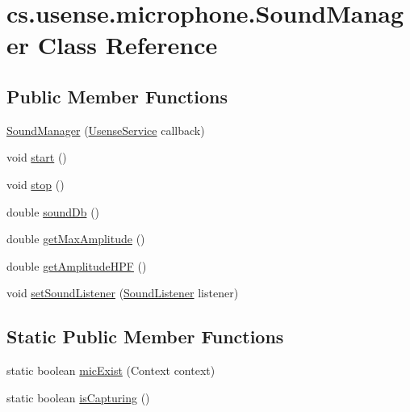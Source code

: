 \hypertarget{classcs_1_1usense_1_1microphone_1_1_sound_manager}{}\section{cs.\+usense.\+microphone.\+Sound\+Manager Class Reference}
\label{classcs_1_1usense_1_1microphone_1_1_sound_manager}
\subsection*{Public Member Functions}
\begin{DoxyCompactItemize}
\item 
\hyperlink{classcs_1_1usense_1_1microphone_1_1_sound_manager_a19056164df8fe6de6f14e92e55de2b8a}{Sound\+Manager} (\hyperlink{classcs_1_1usense_1_1_usense_service}{Usense\+Service} callback)
\item 
void \hyperlink{classcs_1_1usense_1_1microphone_1_1_sound_manager_ae7631d35a3f90932b3c568f2cc6ddc6b}{start} ()
\item 
void \hyperlink{classcs_1_1usense_1_1microphone_1_1_sound_manager_af050c3c4176f1b7bbc2d955ba0e7fd60}{stop} ()
\item 
double \hyperlink{classcs_1_1usense_1_1microphone_1_1_sound_manager_a4992e80dd01380fd08ee9993627f241b}{sound\+Db} ()
\item 
double \hyperlink{classcs_1_1usense_1_1microphone_1_1_sound_manager_a454733a8ba799e043203904ec1e71226}{get\+Max\+Amplitude} ()
\item 
double \hyperlink{classcs_1_1usense_1_1microphone_1_1_sound_manager_a57d2557c71f38c878c8833e60534993b}{get\+Amplitude\+H\+P\+F} ()
\item 
void \hyperlink{classcs_1_1usense_1_1microphone_1_1_sound_manager_a79876b56d977cb0f37b63cba2a83d480}{set\+Sound\+Listener} (\hyperlink{interfacecs_1_1usense_1_1microphone_1_1_sound_listener}{Sound\+Listener} listener)
\end{DoxyCompactItemize}
\subsection*{Static Public Member Functions}
\begin{DoxyCompactItemize}
\item 
static boolean \hyperlink{classcs_1_1usense_1_1microphone_1_1_sound_manager_aea1e2aeefef904f814ab832f1b5e3a43}{mic\+Exist} (Context context)
\item 
static boolean \hyperlink{classcs_1_1usense_1_1microphone_1_1_sound_manager_a0de5a00d32015ff0df267cc54738782b}{is\+Capturing} ()
\end{DoxyCompactItemize}
